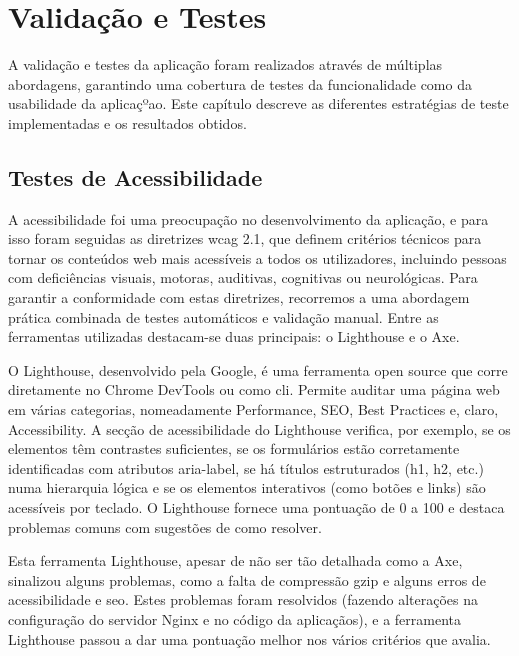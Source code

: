 \chapter{Validação e Testes}
\label{ch:validacaoTestes}

A validação e testes da aplicação foram realizados através de múltiplas abordagens, garantindo uma cobertura de testes  da funcionalidade como da usabilidade da aplicaçºao. Este capítulo descreve as diferentes estratégias de teste implementadas e os resultados obtidos.

\section{Testes de Acessibilidade}

A acessibilidade foi uma preocupação no desenvolvimento da aplicação, e para isso foram seguidas as diretrizes \gls{wcag} 2.1, que definem critérios técnicos para tornar os conteúdos web mais acessíveis a todos os utilizadores, incluindo pessoas com deficiências visuais, motoras, auditivas, cognitivas ou neurológicas. Para garantir a conformidade com estas diretrizes, recorremos a uma abordagem prática combinada de testes automáticos e validação manual. Entre as ferramentas utilizadas destacam-se duas principais: o Lighthouse e o Axe.

O Lighthouse, desenvolvido pela Google, é uma ferramenta open source que corre diretamente no Chrome DevTools ou como \gls{cli}. Permite auditar uma página web em várias categorias, nomeadamente Performance, SEO, Best Practices e, claro, Accessibility. A secção de acessibilidade do Lighthouse verifica, por exemplo, se os elementos têm contrastes suficientes, se os formulários estão corretamente identificadas com atributos aria-label, se há títulos estruturados (h1, h2, etc.) numa hierarquia lógica e se os elementos interativos (como botões e links) são acessíveis por teclado. O Lighthouse fornece uma pontuação de 0 a 100 e destaca problemas comuns com sugestões de como resolver.

Esta ferramenta Lighthouse, apesar de não ser tão detalhada como a Axe, sinalizou alguns problemas, como a falta de compressão \gls{gzip} e alguns erros de acessibilidade e \gls{seo}. Estes problemas foram resolvidos (fazendo alterações na configuração do servidor Nginx e no código da aplicaçãos), e a ferramenta Lighthouse passou a dar uma pontuação melhor nos vários critérios que avalia.

